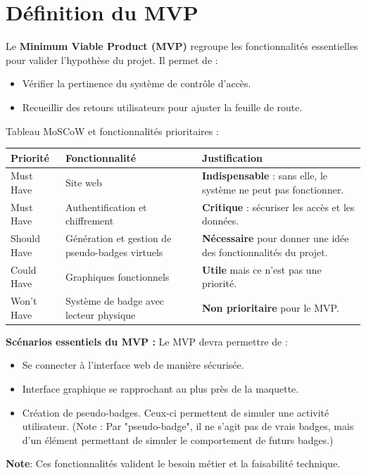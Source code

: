 \newpage

\section{Définition du MVP}

Le \textbf{Minimum Viable Product (MVP)} regroupe les fonctionnalités essentielles pour valider l’hypothèse du projet.
Il permet de :
\begin{itemize}
    \item Vérifier la pertinence du système de contrôle d’accès.
    \item Recueillir des retours utilisateurs pour ajuster la feuille de route.
    \newline
\end{itemize}

\begin{for_you}{Tableau MoSCoW et fonctionnalités prioritaires :}
    \begin{center}
        \begin{tabular}{|p{3cm}|p{5cm}|p{6cm}|}
            \hline
            \textbf{Priorité} & \textbf{Fonctionnalité} & \textbf{Justification} \\
            \hline
            Must Have & Site web & \textbf{Indispensable} : sans elle, le système ne peut pas fonctionner. \\
            \hline
            Must Have & Authentification et chiffrement & \textbf{Critique} : sécuriser les accès et les données. \\
            \hline
            Should Have & Génération et gestion de pseudo-badges virtuels & \textbf{Nécessaire} pour donner une idée des fonctionnalités du projet. \\
            \hline
            Could Have & Graphiques fonctionnels & \textbf{Utile} mais ce n'est pas une priorité. \\
            \hline
            Won’t Have & Système de badge avec lecteur physique & \textbf{Non prioritaire} pour le MVP. \\
            \hline
        \end{tabular}
    \end{center}

    \textbf{\newline Scénarios essentiels du MVP :}
    Le MVP devra permettre de :
    \begin{itemize}
        \item Se connecter à l’interface web de manière sécurisée.
        \item Interface graphique se rapprochant au plus près de la maquette.
        \item Création de pseudo-badges. Ceux-ci permettent de simuler une activité utilisateur. (Note : Par "pseudo-badge", il ne s’agit pas de vrais badges, mais d’un élément permettant de simuler le comportement de futurs badges.)
        \newline
    \end{itemize}
    \textbf{Note}: Ces fonctionnalités valident le besoin métier et la faisabilité technique.
\end{for_you}


